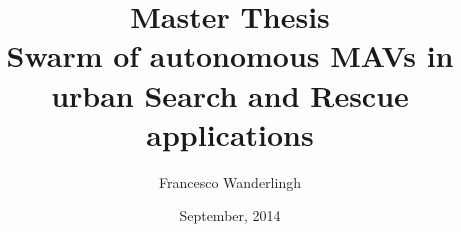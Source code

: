 \documentclass[12pt]{report} %
\title{Master Thesis \\
\bf{Swarm of autonomous MAVs in urban Search and Rescue applications} }
\author{Francesco Wanderlingh}
\date{September, 2014}
\begin{document}
\nocite{*} %



\null\newpage



\null\newpage

\null\newpage

\normalsize %

\tableofcontents
\listoffigures
\listoftables

\clearpage

\onehalfspace
{}









\begin{appendices}

\end{appendices}


\singlespace

\end{document}
